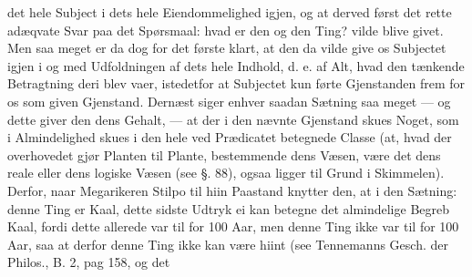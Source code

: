 \documentclass[12pt]{book}
\def\textit#1{#1}%
\newcommand{\opage}[1]{\marginnote{\footnotesize\textit{[#1]}}}
\begin{document}
\opage{262} %
det hele Subject i dets hele Eiendommelighed igjen, og at derved først det rette adæqvate
Svar paa det Spørsmaal: hvad er den og den Ting? vilde blive givet. Men saa meget er da
dog for det første klart, at den da vilde give os Subjectet igjen i og med Udfoldningen af
dets hele Indhold, d. e. af Alt, hvad den tænkende Betragtning deri blev vaer, istedetfor
at Subjectet kun førte Gjenstanden frem for os som given Gjenstand. Dernæst siger enhver
saadan Sætning saa meget --- og dette giver den dens Gehalt, --- at der i den nævnte
Gjenstand skues Noget, som i Almindelighed skues i den hele ved Prædicatet betegnede
Classe (at, hvad der overhovedet gjør Planten til Plante, bestemmende dens Væsen, være det
dens reale eller dens logiske Væsen (see §. 88), ogsaa ligger til Grund i Skimmelen).
Derfor, naar Megarikeren Stilpo til hiin Paastand knytter den, at i den Sætning: denne Ting
er Kaal, dette sidste Udtryk ei kan betegne det almindelige Begreb Kaal, fordi dette
allerede var til for 100 Aar, men denne Ting ikke var til for 100 Aar, saa at derfor denne
Ting ikke kan være hiint (see Tennemanns Gesch. der Philos., B. 2, \textit{pag} 158, og det
\end{document}
